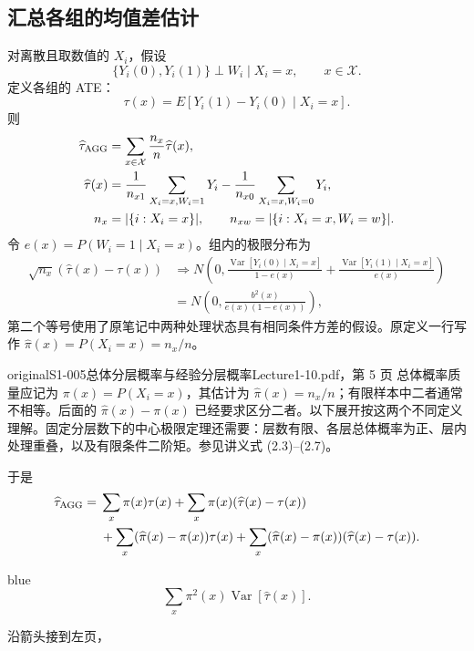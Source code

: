 \subsection{汇总各组的均值差估计}
对离散且取数值的 $X_i$，假设
\[
\{Y_i(0),Y_i(1)\}\perp W_i\mid X_i=x,\qquad x\in\mathcal X.
\]
定义各组的 ATE：
\[
\tau(x)=E[Y_i(1)-Y_i(0)\mid X_i=x].
\]
则
\begin{align*}
\widehat\tau_{\rm AGG}&=\sum_{x\in\mathcal X}\frac{n_x}{n}\widehat\tau(x),\\
\widehat\tau(x)&=\frac1{n_{x1}}\sum_{X_i=x,W_i=1}Y_i
-\frac1{n_{x0}}\sum_{X_i=x,W_i=0}Y_i,\\
n_x&=|\{i:X_i=x\}|,\qquad
n_{xw}=|\{i:X_i=x,W_i=w\}|.
\end{align*}
令 $e(x)=P(W_i=1\mid X_i=x)$。组内的极限分布为
\begin{align*}
\sqrt{n_x}(\widehat\tau(x)-\tau(x))
&\Rightarrow N\left(0,
\frac{\operatorname{Var}[Y_i(0)\mid X_i=x]}{1-e(x)}
+\frac{\operatorname{Var}[Y_i(1)\mid X_i=x]}{e(x)}\right)\\
&=N\left(0,\frac{b^2(x)}{e(x)(1-e(x))}\right),
\end{align*}
第二个等号使用了原笔记中两种处理状态具有相同条件方差的假设。原定义一行写作 $\widehat\pi(x)=P(X_i=x)=n_x/n$。
\begin{reviewnote}{original}{S1-005}{总体分层概率与经验分层概率}{Lecture1-10.pdf，第 5 页}
总体概率质量应记为 $\pi(x)=P(X_i=x)$，其估计为 $\widehat\pi(x)=n_x/n$；有限样本中二者通常不相等。后面的 $\widehat\pi(x)-\pi(x)$ 已经要求区分二者。以下展开按这两个不同定义理解。固定分层数下的中心极限定理还需要：层数有限、各层总体概率为正、层内处理重叠，以及有限条件二阶矩。参见讲义式 (2.3)--(2.7)。
\end{reviewnote}
于是
\begin{align*}
\widehat\tau_{\rm AGG}={}&\sum_x\pi(x)\tau(x)
+\sum_x\pi(x)(\widehat\tau(x)-\tau(x))\\
&+\sum_x(\widehat\pi(x)-\pi(x))\tau(x)
+\sum_x(\widehat\pi(x)-\pi(x))(\widehat\tau(x)-\tau(x)).
\end{align*}
\begin{inkblock}{blue}
\[
\sum_x\pi^2(x)\operatorname{Var}[\widehat\tau(x)].
\]
\end{inkblock}
沿箭头接到左页，

